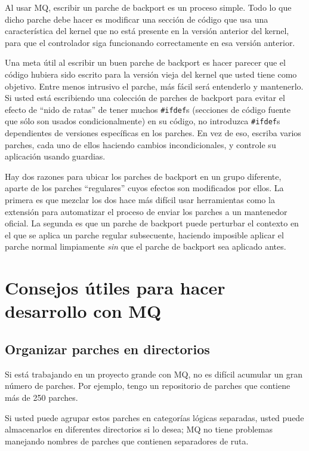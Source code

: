 Al usar MQ, escribir un parche de backport es un proceso simple. Todo
lo que dicho parche debe hacer es modificar una sección de código que
usa una característica del kernel que no está presente en la versión
anterior del kernel, para que el controlador siga funcionando
correctamente en esa versión anterior.

Una meta útil al escribir un buen parche de backport es hacer parecer
que el código hubiera sido escrito para la versión vieja del kernel
que usted tiene como objetivo. Entre menos intrusivo el parche, más
fácil será entenderlo y mantenerlo. Si usted está escribiendo una
colección de parches de backport para evitar el efecto de ``nido de
ratas'' de tener muchos \texttt{\#ifdef}s (secciones de código fuente
que sólo son usados condicionalmente) en su código, no introduzca
\texttt{\#ifdef}s dependientes de versiones específicas en los
parches. En vez de eso, escriba varios parches, cada uno de ellos
haciendo cambios incondicionales, y controle su aplicación usando
guardias.

Hay dos razones para ubicar los parches de backport en un grupo
diferente, aparte de los parches ``regulares'' cuyos efectos son
modificados por ellos. La primera es que mezclar los dos hace más
difícil usar herramientas como la extensión  para
automatizar el proceso de enviar los parches a un mantenedor oficial.
La segunda es que un parche de backport puede perturbar el contexto en
el que se aplica un parche regular subsecuente, haciendo imposible
aplicar el parche normal limpiamente \emph{sin} que el parche de
backport sea aplicado antes.

\section{Consejos útiles para hacer desarrollo con MQ}

\subsection{Organizar parches en directorios}

Si está trabajando en un proyecto grande con MQ, no es difícil
acumular un gran número de parches. Por ejemplo, tengo un repositorio
de parches que contiene más de 250 parches.

Si usted puede agrupar estos parches en categorías lógicas separadas,
usted puede almacenarlos en diferentes directorios si lo desea; MQ no
tiene problemas manejando nombres de parches que contienen separadores
de ruta.

